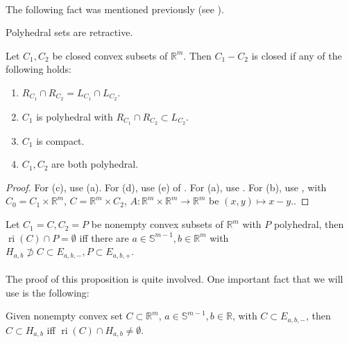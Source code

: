 \paragraph{}The following fact was mentioned previously (see ).
\begin{lemm}\label{lemm:017-polyhedral-retractive}
	Polyhedral sets are retractive.
\end{lemm}

\begin{prop}\label{prop:017-closedness-vec-diff}
	Let $C_1,C_2$ be closed convex subsets of $\mathbb{R}^m$. Then $C_1-C_2$ is closed if any of the following holds:
	\begin{enumerate}[label=(\alph*)]
		\item $R_{C_1}\cap R_{C_2}=L_{C_1}\cap L_{C_2}$.
		\item $C_1$ is polyhedral with $R_{C_1}\cap R_{C_2}\subset L_{C_2}$.
		\item $C_1$ is compact.
		\item $C_1,C_2$ are both polyhedral.
	\end{enumerate}
\end{prop}

\begin{proof}
	For (c), use (a). For (d), use (e) of . For (a), use . For (b), use ,  with $C_0=C_1\times \mathbb{R}^{m}$, $C=\mathbb{R}^m\times C_2$, $A:\mathbb{R}^{m}\times \mathbb{R}^m\to \mathbb{R}^m$ be $(x,y)\mapsto x-y$..
\end{proof}

\begin{prop}\label{prop:017-polyhedral-proper-sep}
	Let $C_1=C,C_2=P$ be nonempty convex subsets of $\mathbb{R}^m$ with $P$ polyhedral, then $\operatorname{ri}(C)\cap P=\emptyset$ iff there are $a\in \mathbb{S}^{m-1},b\in \mathbb{R}^m$ with $H_{a,b}\nsupset C\subset E_{a,b,-},P\subset E_{a,b,+}$.
\end{prop}

\paragraph{}The proof of this proposition is quite involved. One important fact that we will use is the following:

\begin{lemm}\label{lemm:017-criterion-hyperplane-containment}
	Given nonempty convex set $C\subset \mathbb{R}^m$, $a\in \mathbb{S}^{m-1},b\in \mathbb{R}$, with $C\subset E_{a,b,-}$, then $C\subset H_{a,b}$ iff $\operatorname{ri}(C)\cap H_{a,b}\neq\emptyset$.
\end{lemm}

